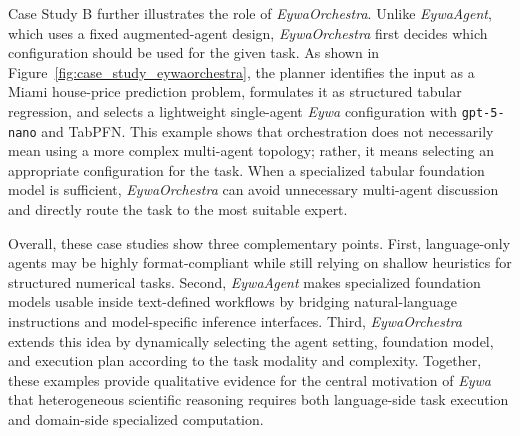 Case Study B further illustrates the role of \textit{EywaOrchestra}. Unlike \textit{EywaAgent}, which uses a fixed augmented-agent design, \textit{EywaOrchestra} first decides which configuration should be used for the given task. As shown in Figure~\ref{fig:case_study_eywaorchestra}, the planner identifies the input as a Miami house-price prediction problem, formulates it as structured tabular regression, and selects a lightweight single-agent \textit{Eywa} configuration with \texttt{gpt-5-nano} and TabPFN. This example shows that orchestration does not necessarily mean using a more complex multi-agent topology; rather, it means selecting an appropriate configuration for the task. When a specialized tabular foundation model is sufficient, \textit{EywaOrchestra} can avoid unnecessary multi-agent discussion and directly route the task to the most suitable expert.

Overall, these case studies show three complementary points. First, language-only agents may be highly format-compliant while still relying on shallow heuristics for structured numerical tasks. Second, \textit{EywaAgent} makes specialized foundation models usable inside text-defined workflows by bridging natural-language instructions and model-specific inference interfaces. Third, \textit{EywaOrchestra} extends this idea by dynamically selecting the agent setting, foundation model, and execution plan according to the task modality and complexity. Together, these examples provide qualitative evidence for the central motivation of \textit{Eywa} that heterogeneous scientific reasoning requires both language-side task execution and domain-side specialized computation.



